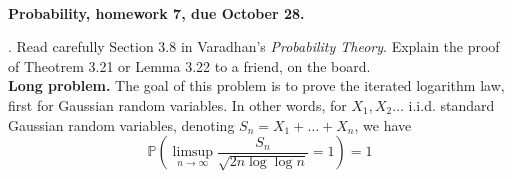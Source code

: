 \documentclass[11pt,reqno]{amsart}
\newcommand{\1}{\mathds{1}}
\theoremstyle{definition}
\theoremstyle{remark}
\numberwithin{equation}{section}
\begin{document}
~\vspace{-3cm}



\begin{center}
{\bf Probability, homework 7, due October 28.}
\end{center}
\vspace{0.5cm}
\small


.
Read carefully Section 3.8 in Varadhan's {\it Probability Theory}.  Explain the proof of Theotrem 3.21 or Lemma 3.22 to a friend, on the board.\\






{\noindent \bf Long problem.} The goal of this problem is to prove the iterated logarithm law, first for Gaussian random variables. In other words, for $X_1, X_2\dots$ i.i.d. standard Gaussian random variables, denoting $S_n=X_1+\dots+X_n$, we have
\begin{equation}\label{eqn:ILL}
\mathbb{P}\left(
\limsup_{n\to\infty}\frac{S_n}{\sqrt{2n\log\log n}}=1
\right)
=1
\end{equation}
\end{document}
